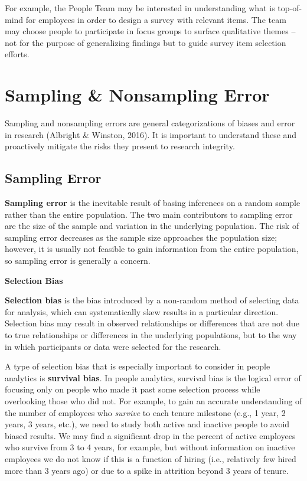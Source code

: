 \documentclass[
]{book}
\begin{document}
For example, the People Team may be interested in understanding what is top-of-mind for employees in order to design a survey with relevant items. The team may choose people to participate in focus groups to surface qualitative themes -- not for the purpose of generalizing findings but to guide survey item selection efforts.

\hypertarget{sampling-nonsampling-error}{%
\section{Sampling \& Nonsampling Error}\label{sampling-nonsampling-error}}

Sampling and nonsampling errors are general categorizations of biases and error in research (Albright \& Winston, 2016). It is important to understand these and proactively mitigate the risks they present to research integrity.

\hypertarget{sampling-error}{%
\subsection{Sampling Error}\label{sampling-error}}

\textbf{Sampling error} is the inevitable result of basing inferences on a random sample rather than the entire population. The two main contributors to sampling error are the size of the sample and variation in the underlying population. The risk of sampling error decreases as the sample size approaches the population size; however, it is usually not feasible to gain information from the entire population, so sampling error is generally a concern.

\textbf{Selection Bias}

\textbf{Selection bias} is the bias introduced by a non-random method of selecting data for analysis, which can systematically skew results in a particular direction. Selection bias may result in observed relationships or differences that are not due to true relationships or differences in the underlying populations, but to the way in which participants or data were selected for the research.

A type of selection bias that is especially important to consider in people analytics is \textbf{survival bias}. In people analytics, survival bias is the logical error of focusing only on people who made it past some selection process while overlooking those who did not. For example, to gain an accurate understanding of the number of employees who \emph{survive} to each tenure milestone (e.g., 1 year, 2 years, 3 years, etc.), we need to study both active and inactive people to avoid biased results. We may find a significant drop in the percent of active employees who survive from 3 to 4 years, for example, but without information on inactive employees we do not know if this is a function of hiring (i.e., relatively few hired more than 3 years ago) or due to a spike in attrition beyond 3 years of tenure.
\end{document}
